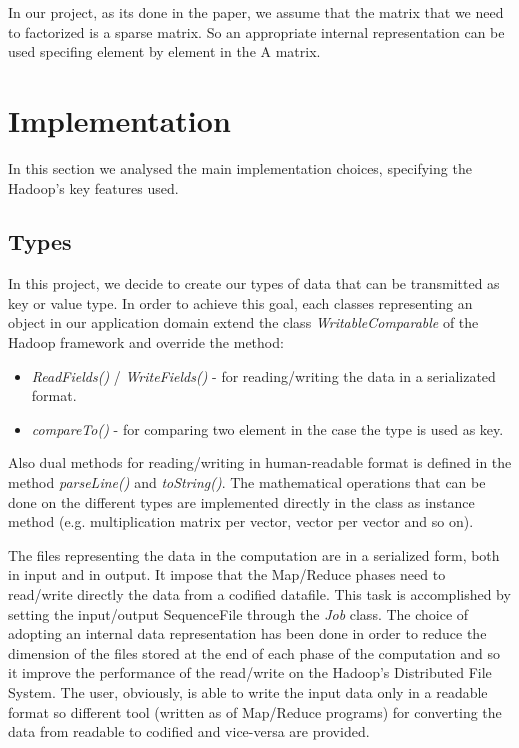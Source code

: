 \documentclass[a4paper,12pt]{article}
\newcommand{\METHOD}[1] {\textit{#1}}
\newcommand{\CLASS}[1] {\textit{#1}}
\begin{document}
In our project, as its done in the paper, we assume that the matrix that we need to factorized is a sparse matrix. So an appropriate internal representation can be used specifing element by element in the A matrix.

\section{Implementation}

In this section we analysed the main implementation choices, specifying the Hadoop's key features used.


\subsection{Types}
In this project, we decide to create our types of data that can be transmitted as key or value type. In order to achieve this goal, each classes representing an object in our application domain extend the class \CLASS{WritableComparable} of the Hadoop framework and override the method:
\begin{itemize}
  \item \METHOD{ReadFields()} / \METHOD{WriteFields()} - for reading/writing the data in a serializated format.
  \item \METHOD{compareTo()} - for comparing two element in the case the type is used as key.
\end{itemize}

Also dual methods for reading/writing in human-readable format is defined in the method \METHOD{parseLine()} and \METHOD{toString()}. The mathematical operations that can be done on the different types are implemented directly in the class as instance method (e.g. multiplication matrix per vector, vector per vector and so on). 

The files representing the data in the computation are in a serialized form, both in input and in output. It impose that the Map/Reduce phases need to read/write directly the data from a codified datafile. This task is accomplished by setting the input/output SequenceFile through the \CLASS{Job} class. The choice of adopting an internal data representation has been done in order to reduce the dimension of the files stored at the end of each phase of the computation and so it improve the performance of the read/write on the Hadoop's Distributed File System. The user, obviously, is able to write the input data only in a readable format so different tool (written as of Map/Reduce programs) for converting the data from readable to codified and vice-versa are provided.
\end{document}
